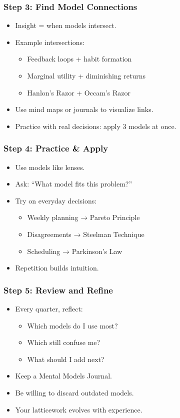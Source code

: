 \begin{frame}[fragile]\frametitle{Step 3: Find Model Connections}
  \begin{itemize}
    \item Insight = when models intersect.
    \item Example intersections:
      \begin{itemize}
        \item Feedback loops + habit formation
        \item Marginal utility + diminishing returns
        \item Hanlon's Razor + Occam's Razor
      \end{itemize}
    \item Use mind maps or journals to visualize links.
    \item Practice with real decisions: apply 3 models at once.
  \end{itemize}
\end{frame}

\begin{frame}[fragile]\frametitle{Step 4: Practice \& Apply}
  \begin{itemize}
    \item Use models like lenses.
    \item Ask: ``What model fits this problem?''
    \item Try on everyday decisions:
      \begin{itemize}
        \item Weekly planning → Pareto Principle
        \item Disagreements → Steelman Technique
        \item Scheduling → Parkinson's Law
      \end{itemize}
    \item Repetition builds intuition.
  \end{itemize}
\end{frame}

\begin{frame}[fragile]\frametitle{Step 5: Review and Refine}
  \begin{itemize}
    \item Every quarter, reflect:
      \begin{itemize}
        \item Which models do I use most?
        \item Which still confuse me?
        \item What should I add next?
      \end{itemize}
    \item Keep a Mental Models Journal.
    \item Be willing to discard outdated models.
    \item Your latticework evolves with experience.
  \end{itemize}
\end{frame}


